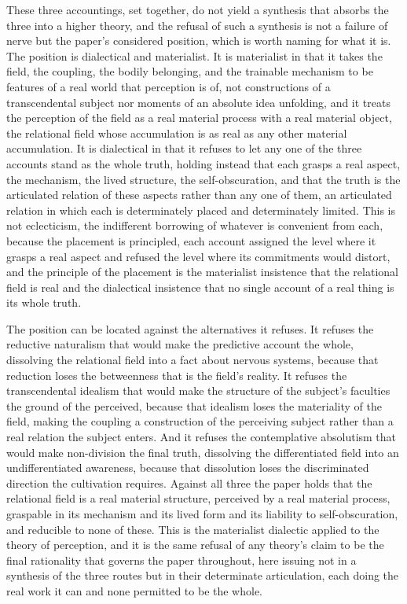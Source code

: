 These three accountings, set together, do not yield a synthesis that absorbs the three into a higher theory, and the refusal of such a synthesis is not a failure of nerve but the paper's considered position, which is worth naming for what it is. The position is dialectical and materialist. It is materialist in that it takes the field, the coupling, the bodily belonging, and the trainable mechanism to be features of a real world that perception is of, not constructions of a transcendental subject nor moments of an absolute idea unfolding, and it treats the perception of the field as a real material process with a real material object, the relational field whose accumulation is as real as any other material accumulation. It is dialectical in that it refuses to let any one of the three accounts stand as the whole truth, holding instead that each grasps a real aspect, the mechanism, the lived structure, the self-obscuration, and that the truth is the articulated relation of these aspects rather than any one of them, an articulated relation in which each is determinately placed and determinately limited. This is not eclecticism, the indifferent borrowing of whatever is convenient from each, because the placement is principled, each account assigned the level where it grasps a real aspect and refused the level where its commitments would distort, and the principle of the placement is the materialist insistence that the relational field is real and the dialectical insistence that no single account of a real thing is its whole truth.

The position can be located against the alternatives it refuses. It refuses the reductive naturalism that would make the predictive account the whole, dissolving the relational field into a fact about nervous systems, because that reduction loses the betweenness that is the field's reality. It refuses the transcendental idealism that would make the structure of the subject's faculties the ground of the perceived, because that idealism loses the materiality of the field, making the coupling a construction of the perceiving subject rather than a real relation the subject enters. And it refuses the contemplative absolutism that would make non-division the final truth, dissolving the differentiated field into an undifferentiated awareness, because that dissolution loses the discriminated direction the cultivation requires. Against all three the paper holds that the relational field is a real material structure, perceived by a real material process, graspable in its mechanism and its lived form and its liability to self-obscuration, and reducible to none of these. This is the materialist dialectic applied to the theory of perception, and it is the same refusal of any theory's claim to be the final rationality that governs the paper throughout, here issuing not in a synthesis of the three routes but in their determinate articulation, each doing the real work it can and none permitted to be the whole.
